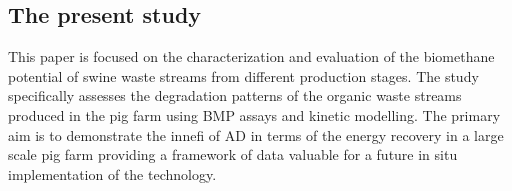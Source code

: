 \subsection{The present study}
This paper is focused on the characterization and evaluation of the biomethane potential of swine waste streams from different production stages. The study specifically assesses the degradation patterns of the organic waste streams produced in the pig farm using BMP assays and kinetic modelling. The primary aim is to demonstrate the innefi of AD in terms of the energy recovery in a large scale pig farm providing a framework of data valuable for a future in situ implementation of the technology.